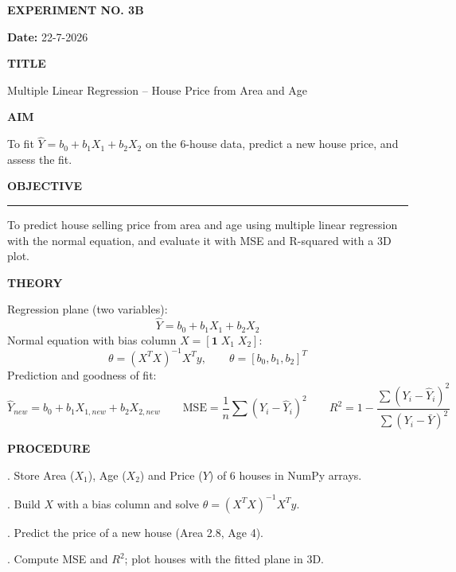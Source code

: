 \documentclass[11pt,twoside]{article}
\newcommand{\expheading}[1]{{\fontsize{14}{17}\selectfont\textbf{#1}\par}}
\newcommand{\fullrule}{\noindent\rule{\textwidth}{0.6pt}\par}
\begin{document}
{\setlength{\parskip}{1pt}\setlength{\abovedisplayskip}{2pt}\setlength{\belowdisplayskip}{2pt}
\begin{center}
\expheading{EXPERIMENT NO. 3B}
\end{center}
\vspace{2pt}

\noindent\textbf{Date:} 22-7-2026\par
\vspace{6pt}

\expheading{TITLE}
\vspace{4pt}
\noindent Multiple Linear Regression -- House Price from Area and Age\par
\vspace{4pt}

\expheading{AIM}
\vspace{4pt}
\noindent To fit $\hat{Y}=b_0+b_1X_1+b_2X_2$ on the 6-house data, predict a new house price, and assess the fit. \par
\vspace{4pt}

\expheading{OBJECTIVE}
\vspace{2pt}
\fullrule
\vspace{4pt}
\noindent To predict house selling price from area and age using multiple linear regression with the normal equation, and evaluate it with MSE and R-squared with a 3D plot. \par
\vspace{4pt}

\expheading{THEORY}
\vspace{4pt}
Regression plane (two variables):
\[\hat{Y}=b_0+b_1X_1+b_2X_2\]
Normal equation with bias column $X=[\mathbf{1}\;X_1\;X_2]$:
\[\theta=(X^TX)^{-1}X^Ty,\qquad \theta=[b_0,b_1,b_2]^T\]
Prediction and goodness of fit:
\[\hat{Y}_{new}=b_0+b_1X_{1,new}+b_2X_{2,new}\qquad \mathrm{MSE}=\frac{1}{n}\sum(Y_i-\hat{Y}_i)^2\qquad R^2=1-\frac{\sum(Y_i-\hat{Y}_i)^2}{\sum(Y_i-\bar{Y})^2}\]
\vspace{4pt}

\expheading{PROCEDURE}
\vspace{4pt}
. Store Area ($X_1$), Age ($X_2$) and Price ($Y$) of 6 houses in NumPy arrays.\par
{}. Build $X$ with a bias column and solve $\theta=(X^TX)^{-1}X^Ty$.\par
{}. Predict the price of a new house (Area 2.8, Age 4).\par
{}. Compute MSE and $R^2$; plot houses with the fitted plane in 3D. \par
\vspace{4pt}

}
\end{document}
